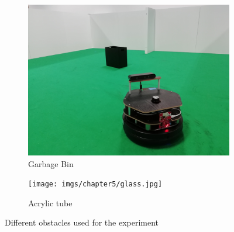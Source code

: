 \begin{figure}[ht!]
\begin{subfigure}[b]{0.3\linewidth}
    \includegraphics[width=\linewidth]{imgs/chapter5/garbage.jpg}
    \caption{Garbage Bin}
    \label{fig::garbage}
  \end{subfigure}
  \begin{subfigure}[b]{0.3\linewidth}
    \texttt{[image: imgs/chapter5/glass.jpg]}
    \caption{Acrylic tube}
    \label{fig::tube}
  \end{subfigure}
  \caption{Different obstacles used for the experiment}
  \label{fig:obstacles}
\end{figure}

